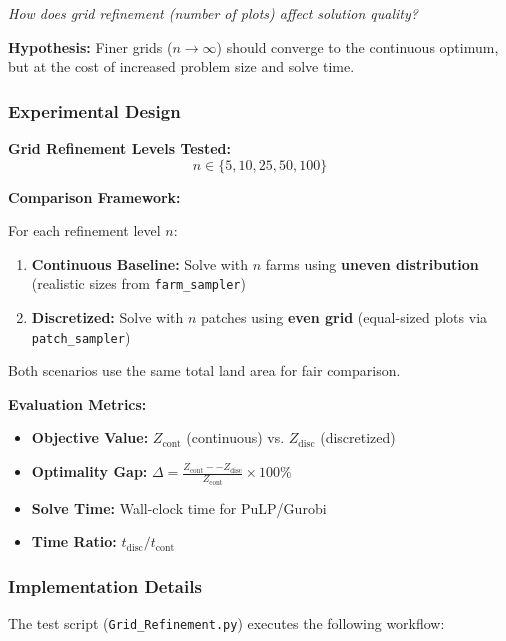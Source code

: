 \documentclass{oqireport}
\begin{document}
\begin{center}
\textit{How does grid refinement (number of plots) affect solution quality?}
\end{center}

\textbf{Hypothesis:} Finer grids ($n \to \infty$) should converge to the continuous optimum, but at the cost of increased problem size and solve time.

\subsubsection{Experimental Design}

\textbf{Grid Refinement Levels Tested:}
$$n \in \{5, 10, 25, 50, 100\}$$

\textbf{Comparison Framework:}

For each refinement level $n$:
\begin{enumerate}
    \item \textbf{Continuous Baseline:} Solve with $n$ farms using \textbf{uneven distribution} (realistic sizes from \texttt{farm\_sampler})
    \item \textbf{Discretized:} Solve with $n$ patches using \textbf{even grid} (equal-sized plots via \texttt{patch\_sampler})
\end{enumerate}

Both scenarios use the same total land area for fair comparison.

\textbf{Evaluation Metrics:}
\begin{itemize}
    \item \textbf{Objective Value:} $Z_{\text{cont}}$ (continuous) vs. $Z_{\text{disc}}$ (discretized)
    \item \textbf{Optimality Gap:} $\Delta = \frac{Z_{\text{cont}} -- Z_{\text{disc}}}{Z_{\text{cont}}} \times 100\%$
    \item \textbf{Solve Time:} Wall-clock time for PuLP/Gurobi
    \item \textbf{Time Ratio:} $t_{\text{disc}} / t_{\text{cont}}$
\end{itemize}

\subsubsection{Implementation Details}

The test script (\texttt{Grid\_Refinement.py}) executes the following workflow:
\end{document}
